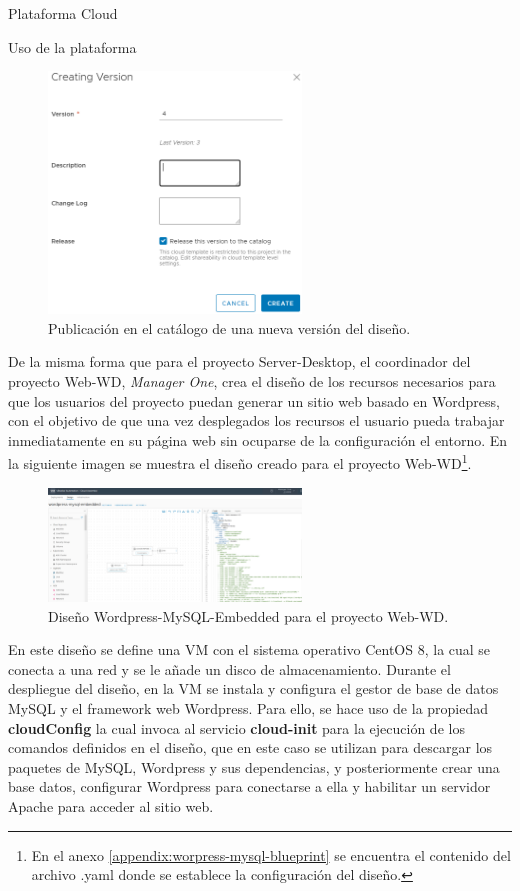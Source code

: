 \begin{subsection}{Plataforma Cloud}
\begin{subsubsection}{Uso de la plataforma}
\begin{figure}[h]
            \includegraphics[width=0.6\textwidth]{imaxes/pruebaconcepto/vrealize/create-version-blueprint.png}
            \caption{Publicación en el catálogo de una nueva versión del diseño.}
            \label{fig:publication-version}
        \end{figure}
        \FloatBarrier

        De la misma forma que para el proyecto Server-Desktop, el coordinador del proyecto Web-WD, \textit{Manager One}, crea el diseño de los recursos necesarios para que los usuarios del proyecto puedan generar un sitio web basado en Wordpress, con el objetivo de que una vez desplegados los recursos el usuario pueda trabajar inmediatamente en su página web sin ocuparse de la configuración el entorno. En la siguiente imagen se muestra el diseño creado para el proyecto Web-WD\footnote{En el anexo \ref{appendix:worpress-mysql-blueprint} se encuentra el contenido del archivo .yaml donde se establece la configuración del diseño.}.
        \begin{figure}[h]
            \centering
            \includegraphics[width=0.6\textwidth]{imaxes/pruebaconcepto/vrealize/wordpress-mysql-blueprint.png}
            \caption{Diseño Wordpress-MySQL-Embedded para el proyecto Web-WD.}
            \label{fig:web-WD-blueprint}
        \end{figure}
        \FloatBarrier
        En este diseño se define una VM con el sistema operativo CentOS 8, la cual se conecta a una red y se le añade un disco de almacenamiento. Durante el despliegue del diseño, en la VM se instala y configura el gestor de base de datos MySQL y el framework web Wordpress. Para ello, se hace uso de la propiedad \textbf{cloudConfig} la cual invoca al servicio \textbf{cloud-init} para la ejecución de los comandos definidos en el diseño, que en este caso se utilizan para descargar los paquetes de MySQL, Wordpress y sus dependencias, y posteriormente crear una base datos, configurar Wordpress para conectarse a ella y habilitar un servidor Apache para acceder al sitio web. 
        

\end{subsubsection}
\end{subsection}
